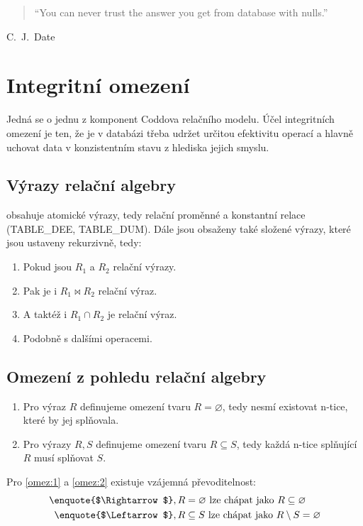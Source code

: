 \begin{quote}
\foreignlanguage{english}{\enquote{You can never trust the answer you get from database with nulls.}}
\end{quote}
\hfill C.~J.~Date

\section{Integritní omezení}
Jedná se o jednu z komponent Coddova relačního modelu. Účel integritních omezení je ten, že je v databázi třeba udržet určitou efektivitu operací a hlavně uchovat data v konzistentním stavu z hlediska jejich smyslu.

\subsection{Výrazy relační algebry}
 obsahuje atomické výrazy, tedy relační proměnné a konstantní relace (TABLE\_DEE, TABLE\_DUM). Dále jsou obsaženy také složené výrazy, které jsou ustaveny rekurzivně, tedy:
\begin{enumerate}
\item Pokud jsou $R_{1}$ a $R_{2}$ relační výrazy.
\item Pak je i $R_{1} \Join R_{2}$ relační výraz.
\item A taktéž i $R_{1} \cap R_{2}$ je relační výraz.
\item Podobně s dalšími operacemi.
\end{enumerate}

\subsection{Omezení z pohledu relační algebry}
\begin{enumerate}
\item\label{omez:1} Pro výraz $R$ definujeme omezení tvaru $R = \varnothing$, tedy nesmí existovat n-tice, které by jej splňovala.
\item\label{omez:2} Pro výrazy $R, S$ definujeme omezení tvaru $R \subseteq S$, tedy každá n-tice splňující $R$ musí splňovat $S$.
\end{enumerate}
Pro \ref{omez:1} a \ref{omez:2} existuje vzájemná převoditelnost:
\begin{align*}
\text{\enquote{$\Rightarrow$}}&, R = \varnothing \text{ lze chápat jako } R \subseteq \varnothing \\
\text{\enquote{$\Leftarrow$}}&, R \subseteq S \text{ lze chápat jako } R \setminus S = \varnothing
\end{align*}

